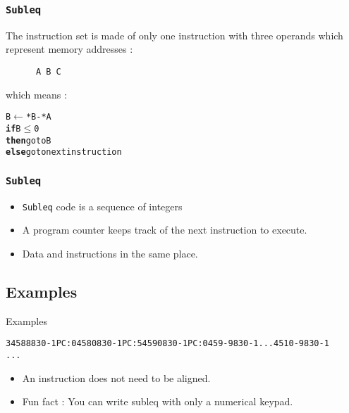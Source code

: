 \documentclass{beamer}
\begin{document}
\begin{frame}[fragile]
    \frametitle{\texttt{Subleq}}
    The instruction set is made of only one instruction with three
    operands which represent memory addresses :
    \\[11pt]
    \begin{verbatim}
      A B C
    \end{verbatim}
    \pause
    which means :

    \begin{alltt}
       B \(\leftarrow\) *B - *A
      {\bf if} B \(\leq\) 0
      {\bf then} go to B
      {\bf else} go to next instruction
    \end{alltt}

\end{frame}

\begin{frame}
  \frametitle{\texttt{Subleq}}
  \begin{itemize}
    \item \texttt{Subleq} code is a sequence of integers%
    \item<2-> A program counter keeps track of the next instruction to execute.
    \item<3-> Data and instructions in the same place.
  \end{itemize}
\end{frame}

\subsection{Examples}
\begin{frame}[fragile]{Examples}
  \begin{alltt}
  3  4  5   8  8   8  3  0  -1     PC : 0  4  5   8  0   8  3  0  -1     PC : 5  4  5   9  0   8  3  0  -1     PC : 0  4  5   9 -9   8  3  0  -1     ...  4  5  10 -9   8  3  0  -1
  ...
  \end{alltt}
  \begin{itemize}
    \item<6-> An instruction does not need to be aligned.
    \item<7-> Fun fact : You can write subleq with only a numerical keypad.
  \end{itemize}
\end{frame}
\end{document}
